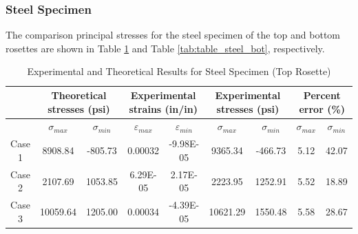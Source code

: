 \documentclass[12pt, titlepage]{article}
\begin{document}
\subsubsection{Steel Specimen}
The comparison principal stresses for the steel specimen of the top and
bottom rosettes are shown in Table \ref{tab:table_steel_top} and Table
\ref{tab:table_steel_bot}, respectively.
\begin{table}[H]
  \begin{adjustwidth}{-1in}{-1in}
    \begin{tabular}{|c|c|c|c|c|c|c|c|c|} \hline
        & \multicolumn{2}{|c|}{\parbox{4cm}{\centering\textbf{Theoretical stresses (psi)}}} 
        & \multicolumn{2}{|c|}{\parbox{4cm}{\centering\textbf{Experimental strains (in/in)}}} 
        & \multicolumn{2}{|c|}{\parbox{4cm}{\centering\textbf{Experimental stresses (psi)}}} 
        & \multicolumn{2}{|c|}{\parbox{4cm}{\centering\textbf{Percent error (\%)}}} 
        \\ \hline
        & $\sigma_{max}$ & $\sigma_{min}$ & $\varepsilon_{max}$ & $\varepsilon_{min}$ & $\sigma_{max}$ & $\sigma_{min}$ & $\sigma_{max}$ & $\sigma_{min}$ \\ \hline
        Case 1 & 8908.84 & -805.73 & 0.00032 & -9.98E-05 & 9365.34 & -466.73 & 5.12 & 42.07 \\ \hline
        Case 2 & 2107.69 & 1053.85 & 6.29E-05 & 2.17E-05 & 2223.95 & 1252.91 & 5.52 & 18.89 \\ \hline
        Case 3 & 10059.64 & 1205.00 & 0.00034 & -4.39E-05 & 10621.29 & 1550.48 & 5.58 & 28.67 \\ \hline
    \end{tabular}
  \end{adjustwidth}
  \captionsetup{justification=raggedright,singlelinecheck=false}
  \caption{Experimental and Theoretical Results for Steel Specimen (Top Rosette)}
  \label{tab:table_steel_top}
\end{table}
\end{document}
